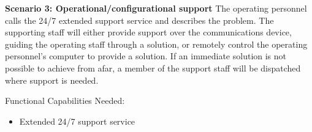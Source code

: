 \vspace{20pt}
\noindent \textbf{Scenario 3: Operational/configurational support}
The operating personnel calls the 24/7 extended support service and describes the problem. The supporting staff will either provide support over the communications device, guiding the operating staff through a solution, or remotely control the operating personnel’s computer to provide a solution. If an immediate solution is not possible to achieve from afar, a member of the support staff will be dispatched where support is needed. 

\noindent Functional Capabilities Needed:
\begin{itemize}
	\item Extended 24/7 support service
\end{itemize}













